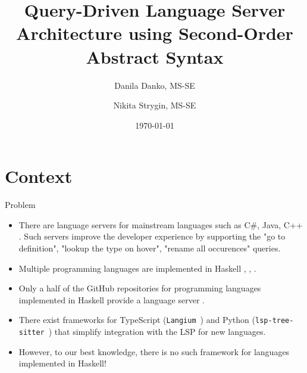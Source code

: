 \documentclass[serif, aspectratio=169]{beamer}
\author[Danko, Strygin]{Danila Danko, MS-SE \inst{1} \and Nikita Strygin, MS-SE \inst{1} \and \newline \newline {Supervisor: Nikolai Kudasov \inst{1}}}
\title{Query-Driven Language Server Architecture using Second-Order Abstract Syntax}
\institute{
    \inst{1}Innopolis University
}
\date{\small \today}
\begin{document}
\begin{frame}
    \titlepage
\end{frame}

\begin{frame}
    \tableofcontents[sectionstyle=show,
        subsectionstyle=show/shaded/hide,
        subsubsectionstyle=show/shaded/hide]
\end{frame}

\section{Context}

\begin{frame}{Problem}
    \begin{itemize}
        [<+-| alert+>] %
        \item There are language servers \cite{noauthor_language_server_protocol_2024} for mainstream languages such as C\#, Java, C++ \cite{lsp_implementations}. Such servers improve the developer experience by supporting the "go to definition", "lookup the type on hover", "rename all occurences" queries.
        \item Multiple programming languages are implemented in Haskell \cite{github_haskell_programming_language}, \cite{hackage_formal_languages}, \cite{hackage_language}.
        \item Only a half of the GitHub repositories for programming languages implemented in Haskell provide a language server \cite{github_lsp_module}.
        \item There exist frameworks for TypeScript (\texttt{Langium}~\cite{noauthor_langium_nodate}) and Python (\texttt{lsp-tree-sitter}~\cite{noauthor_neomuttlsp-tree-sitter_2024}) that simplify integration with the LSP for new languages.
        \item However, to our best knowledge, there is no such framework for languages implemented in Haskell!
    \end{itemize}
\end{frame}
\end{document}
